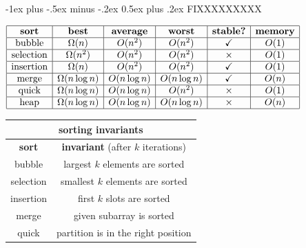 \documentclass[10pt, landscape]{article}
\makeatletter
\newenvironment{tightcenter}{%
  \setlength\topsep{0pt}
  \setlength\parskip{0pt}
  \begin{center}
}{%
  \end{center}
}
\renewcommand{\section}{\@startsection{section}{1}{0mm}%
                                {-1ex plus -.5ex minus -.2ex}%
                                {0.5ex plus .2ex}%
                                {\normalfont\large\bfseries}}
\makeatother
\begin{document}
\section{FIXXXXXXXXX}
\begin{minipage}{0.5\linewidth}   
    \begin{tightcenter}
        $\begin{array}{| c | c | c | c | c | c |}
            \hline\textbf{sort} & \textbf{best} & \textbf{average} & \textbf{worst} & \textbf{stable?} & \textbf{memory}
    
            \\\hline\text{bubble} & \Omega(n) & O(n^2) & O(n^2) & \checkmark & O(1)
            
            \\\hline\text{selection} & \Omega(n^2) & O(n^2) & O(n^2) & \times & O(1)
            
            \\\hline\text{insertion} & \Omega(n) & O(n^2) & O(n^2) & \checkmark & O(1)
            
            \\\hline\text{merge} & \Omega(n\log n) & O(n\log n) & O(n\log n) & \checkmark & O(n)
            
            \\\hline\text{quick} & \Omega(n\log n) & O(n\log n) & O(n^2) & \times & O(1)

            \\\hline\text{heap} & \Omega(n\log n) & O(n\log n) & O(n\log n) & \times & O(n)
            \\\hline
        \end{array} 
        $\
        \begin{tabular}{| c | c |}
            \multicolumn{2}{c}{sorting invariants}
            \\\hline\textbf{sort} & \textbf{invariant} (after $k$ iterations)
            \\\hline bubble & largest $k$ elements are sorted
            \\\hline selection & smallest $k$ elements are sorted
            \\\hline insertion & first $k$ slots are sorted
            \\\hline merge & given subarray is sorted
            \\\hline quick & partition is in the right position
            \\\hline
        \end{tabular} 
    \end{tightcenter}
    
\end{minipage}
\end{document}
